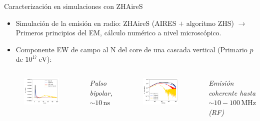 \documentclass{beamer}
\begin{document}
	\begin{frame}{Caracterización en simulaciones con ZHAireS}
		\begin{itemize}
			\item Simulación de la emisión en radio: ZHAireS (AIRES $+$ algoritmo ZHS) $\rightarrow$ Primeros principios del EM, cálculo numérico a nivel microscópico.
			\item Componente EW de campo al N del core de una cascada vertical (Primario $p$ de $10^{17}\,\mathrm{eV}$):
		\end{itemize}
	\begin{columns}
		\begin{figure}[H]
			\centering
			\includegraphics[width=.95\linewidth]{figures/radio/p_1e17_0deg_EW_N_v2}
		\end{figure}
	\begin{block}{}
		\centering\textit{Pulso bipolar, $\sim 10 \,\mathrm{ns}$}
	\end{block}
\begin{figure}[H]
	\centering
	\includegraphics[width=.95\linewidth]{figures/radio/p_1e17_0deg_EW_N_Fourier_v3}
\end{figure}
\begin{block}{}
	\centering\textit{Emisión coherente hasta $\sim10-100\,\mathrm{MHz}$ (RF)}
\end{block}
	\end{columns}
	\end{frame}
\end{document}
